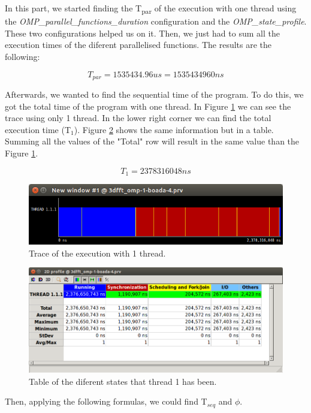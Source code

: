 \documentclass[12pt, a4paper]{article}
\begin{document}
In this part, we started finding the T\textsubscript{par} of the execution with one thread using the \textit{OMP\_parallel\_functions\_duration} configuration and the \textit{OMP\_state\_profile}. These two configurations helped us on it. Then, we just had to sum all the execution times of the diferent parallelised functions. The results are the following:

\[T_{par} = 1535434.96 us = 1535434960 ns \] 

Afterwards, we wanted to find the sequential time of the program. To do this, we got the total time of the program with one thread. In Figure \ref{v0_t1} we can see the trace using only 1 thread. In the lower right corner we can find the total execution time (T$_1$). Figure \ref{v0_excel_t1} shows the same information but in a table. Summing all the values of the "Total" row will result in the same value than the Figure \ref{v0_t1}.

\[T_1 = 2378316048 ns \]

\begin{figure}[H]
  \centering
  \includegraphics[scale=0.5]{./images/v0_t1}
  \caption{Trace of the execution with 1 thread.}
  \label{v0_t1}
\end{figure}

\begin{figure}[H]
  \centering
  \includegraphics[scale=0.5]{./images/v0_excel_t1}
  \caption{Table of the diferent states that thread 1 has been.}
  \label{v0_excel_t1}
\end{figure}

 Then, applying the following formulas, we could find T$_{seq}$ and $\phi$.
\end{document}
